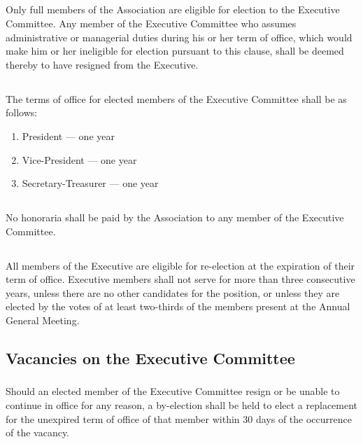 \documentclass[12pt]{article}
\begin{document}
\subsection{}
Only full members of the Association are eligible for election to the Executive Committee. Any member of the Executive Committee who assumes administrative or managerial duties during his or her term of office, which would make him or her ineligible for election pursuant to this clause, shall be deemed thereby to have resigned from the Executive.

\subsection{}
The terms of office for elected members of the Executive Committee shall be as follows:

\begin{enumerate}
\item
President --- one year
\item
Vice-President --- one year
\item
Secretary-Treasurer --- one year
\end{enumerate}

\subsection{}
No honoraria shall be paid by the Association to any member of the Executive Committee.

\subsection{}
All members of the Executive are eligible for re-election at the expiration of their term of office. Executive members shall not serve for more than three consecutive years, unless there are no other candidates for the position, or unless they are elected by the votes of at least two-thirds of the members present at the Annual General Meeting.

\subsection{Vacancies on the Executive Committee}

\subsubsection{}\label{by-elections}
Should an elected member of the Executive Committee resign or be unable to continue in office for any reason, a by-election shall be held to elect a replacement for the unexpired term of office of that member within 30 days of the occurrence of the vacancy.
\end{document}
